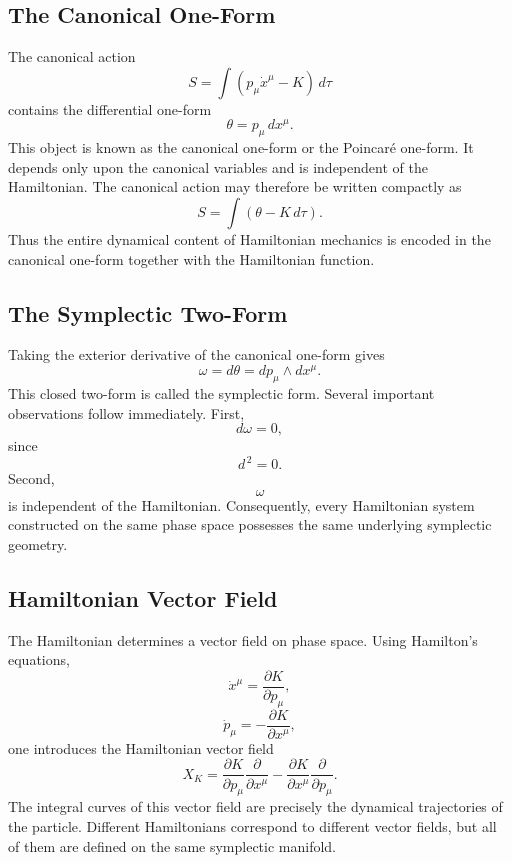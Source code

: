 \subsection{The Canonical One-Form}
The canonical action
\[S=\int(p_\mu \dot x^\mu-K)\,d\tau\]
contains the differential one-form
\[\boxed{\theta=p_\mu\,dx^\mu.}\]
This object is known as the canonical one-form or the Poincaré one-form.
It depends only upon the canonical variables and is independent of the
Hamiltonian.
The canonical action may therefore be written compactly as
\[S=\int(\theta-K\,d\tau).\]
Thus the entire dynamical content of Hamiltonian mechanics is encoded in
the canonical one-form together with the Hamiltonian function.
\subsection{The Symplectic Two-Form}
Taking the exterior derivative of the canonical one-form gives
\[\boxed{\omega=d\theta=dp_\mu\wedge dx^\mu .}\]
This closed two-form is called the symplectic form.
Several important observations follow immediately.
First,
\[d\omega=0,\]
since
\[d^{\,2}=0.\]
Second,
\[\omega\]
is independent of the Hamiltonian.
Consequently, every Hamiltonian system constructed on the same phase
space possesses the same underlying symplectic geometry.
\subsection{Hamiltonian Vector Field}
The Hamiltonian determines a vector field on phase space.
Using Hamilton's equations,
\[\dot x^\mu=\frac{\partial K}{\partial p_\mu},\]
\[\dot p_\mu=-\frac{\partial K}{\partial x^\mu},\]
one introduces the Hamiltonian vector field
\[\boxed{X_K=\frac{\partial K}{\partial p_\mu}\frac{\partial}{\partial x^\mu}
-\frac{\partial K}{\partial x^\mu}\frac{\partial}{\partial p_\mu}.}\]
The integral curves of this vector field are precisely the dynamical
trajectories of the particle.
Different Hamiltonians correspond to different vector fields, but all of
them are defined on the same symplectic manifold.
